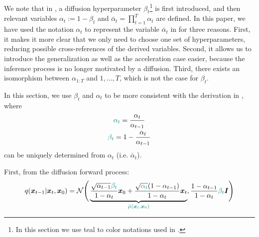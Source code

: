 We note that in \citet{ho2020denoising}, a diffusion hyperparameter {\color{teal} $\beta_t$}\footnote{In this section we use teal to color notations used in \citet{ho2020denoising}.} is first introduced, and then relevant variables {\color{teal}$\alpha_t := 1 - \beta_t$} and {\color{teal}$\bar{\alpha}_t = \prod_{t=1}^{T} \alpha_t$} are defined. In this paper, we have used the notation $\alpha_{t}$ to represent the variable {\color{teal} $\bar{\alpha}_t$} in \citet{ho2020denoising} for three reasons. First, it makes it more clear that we only need to choose one set of hyperparameters, reducing possible cross-references of the derived variables. Second, it allows us to introduce the generalization as well as the acceleration case easier, because the inference process is no longer motivated by a diffusion. Third, there exists an isomorphism between $\alpha_{1:T}$ and $1, \ldots, T$, which is not the case for {\color{teal} $\beta_t$}.

In this section, we use {\color{teal} $\beta_t$} and {\color{teal} $\alpha_t$} to be more consistent with the derivation in \citet{ho2020denoising}, where
\begin{gather}
{\color{teal} \alpha_t} = \frac{\alpha_t}{\alpha_{t-1}} \\
    {\color{teal} \beta_t} = 1 - \frac{\alpha_t}{\alpha_{t-1}} 
\end{gather}
can be uniquely determined from $\alpha_t$ (i.e. {\color{teal}$\bar{\alpha}_t$}).

First, from the diffusion forward process:
\begin{align}
    q({\bm{x}}_{t-1} | {\bm{x}}_t, {\bm{x}}_0) = {\mathcal{N}}\Bigg(\underbrace{\frac{\sqrt{\alpha_{t-1}}{\color{teal} \beta_t}}{1 - \alpha_t} {\bm{x}}_0 + \frac{\sqrt{{\color{teal} \alpha_t}} (1 - \alpha_{t-1})}{1 - \alpha_t} {\bm{x}}_t}_{\color{teal} \tilde{\mu}({\bm{x}}_t, {\bm{x}}_0)}, \frac{1 - \alpha_{t-1}}{1 - \alpha_t} {\color{teal} \beta_t}{\bm{I}}\Bigg) \nonumber
\end{align}


